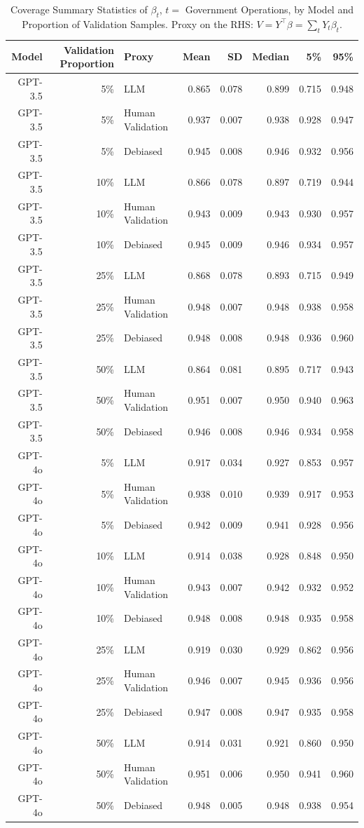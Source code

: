 \begin{table}

\caption{\label{tab:unnamed-chunk-1}Coverage Summary Statistics of $\beta_{t}$, $t=$ Government Operations, by Model and Proportion of Validation Samples.
      Proxy on the RHS: $V = Y^\top \beta = \sum_{t} Y_t \beta_t$.}
\centering
\begin{tabular}[t]{rrlrrrrr}
\toprule
Model & Validation Proportion & Proxy & Mean & SD & Median & 5\% & 95\%\\
\midrule
GPT-3.5 & 5\% & LLM & 0.865 & 0.078 & 0.899 & 0.715 & 0.948\\
GPT-3.5 & 5\% & Human Validation & 0.937 & 0.007 & 0.938 & 0.928 & 0.947\\
GPT-3.5 & 5\% & Debiased & 0.945 & 0.008 & 0.946 & 0.932 & 0.956\\
GPT-3.5 & 10\% & LLM & 0.866 & 0.078 & 0.897 & 0.719 & 0.944\\
GPT-3.5 & 10\% & Human Validation & 0.943 & 0.009 & 0.943 & 0.930 & 0.957\\
GPT-3.5 & 10\% & Debiased & 0.945 & 0.009 & 0.946 & 0.934 & 0.957\\
GPT-3.5 & 25\% & LLM & 0.868 & 0.078 & 0.893 & 0.715 & 0.949\\
GPT-3.5 & 25\% & Human Validation & 0.948 & 0.007 & 0.948 & 0.938 & 0.958\\
GPT-3.5 & 25\% & Debiased & 0.948 & 0.008 & 0.948 & 0.936 & 0.960\\
GPT-3.5 & 50\% & LLM & 0.864 & 0.081 & 0.895 & 0.717 & 0.943\\
GPT-3.5 & 50\% & Human Validation & 0.951 & 0.007 & 0.950 & 0.940 & 0.963\\
GPT-3.5 & 50\% & Debiased & 0.946 & 0.008 & 0.946 & 0.934 & 0.958\\
GPT-4o & 5\% & LLM & 0.917 & 0.034 & 0.927 & 0.853 & 0.957\\
GPT-4o & 5\% & Human Validation & 0.938 & 0.010 & 0.939 & 0.917 & 0.953\\
GPT-4o & 5\% & Debiased & 0.942 & 0.009 & 0.941 & 0.928 & 0.956\\
GPT-4o & 10\% & LLM & 0.914 & 0.038 & 0.928 & 0.848 & 0.950\\
GPT-4o & 10\% & Human Validation & 0.943 & 0.007 & 0.942 & 0.932 & 0.952\\
GPT-4o & 10\% & Debiased & 0.948 & 0.008 & 0.948 & 0.935 & 0.958\\
GPT-4o & 25\% & LLM & 0.919 & 0.030 & 0.929 & 0.862 & 0.956\\
GPT-4o & 25\% & Human Validation & 0.946 & 0.007 & 0.945 & 0.936 & 0.956\\
GPT-4o & 25\% & Debiased & 0.947 & 0.008 & 0.947 & 0.935 & 0.958\\
GPT-4o & 50\% & LLM & 0.914 & 0.031 & 0.921 & 0.860 & 0.950\\
GPT-4o & 50\% & Human Validation & 0.951 & 0.006 & 0.950 & 0.941 & 0.960\\
GPT-4o & 50\% & Debiased & 0.948 & 0.005 & 0.948 & 0.938 & 0.954\\
\bottomrule
\end{tabular}
\end{table}
